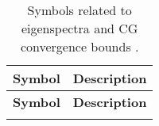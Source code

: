 \begin{longtable}{c p{10cm}}
    \caption{Symbols related to eigenspectra and CG convergence bounds .}\label{tab:eigenspectra_symbols}                                             \\
    \hline
    \textbf{Symbol}                  & \textbf{Description}                                                                                                                                               \\
    \hline
    \endfirsthead

    \hline
    \textbf{Symbol}                  & \textbf{Description}                                                                                                                                               \\
    \hline
    \endhead

    \hline
    \endfoot

    \hline
    \endlastfoot


\end{longtable}
